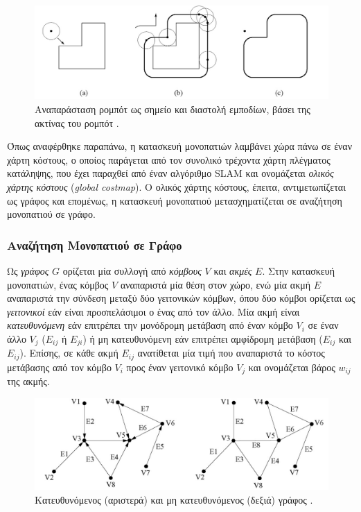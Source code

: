 \begin{figure}[!ht]
	\centering
	\includegraphics[width = 0.7\linewidth]{Chapters/Chapter3/Figures/point_robot_and_inflated_obstacles.png}
	\caption[Αναπαράσταση ρομπότ ως σημείο και διαστολή εμποδίων, βάσει της ακτίνας του ρομπότ. ]{Αναπαράσταση ρομπότ ως σημείο και διαστολή εμποδίων, βάσει της ακτίνας του ρομπότ \cite{principles_of_robot_motion}.}
	\label{fig:point_robot_and_inflated_obstacles}
\end{figure}

\bigskip
Όπως αναφέρθηκε παραπάνω, η κατασκευή μονοπατιών λαμβάνει χώρα πάνω σε έναν χάρτη κόστους, ο οποίος παράγεται από τον συνολικό τρέχοντα χάρτη πλέγματος κατάληψης, που έχει παραχθεί από έναν αλγόριθμο SLAM και ονομάζεται \textit{ολικός χάρτης κόστους} (\textit{global costmap}). Ο ολικός χάρτης κόστους, έπειτα, αντιμετωπίζεται ως γράφος και επομένως, η κατασκευή μονοπατιού μετασχηματίζεται σε αναζήτηση μονοπατιού σε γράφο.

\bigskip 
\subsubsection{Αναζήτηση Μονοπατιού σε Γράφο} \label{sssec:graph_search}
Ως \textit{γράφος} $G$ ορίζεται μία συλλογή από \textit{κόμβους} $V$ και \textit{ακμές} $E$. Στην κατασκευή μονοπατιών, ένας κόμβος $V$ αναπαριστά μία θέση στον χώρο, ενώ μία ακμή $E$ αναπαριστά την σύνδεση μεταξύ δύο γειτονικών κόμβων, όπου δύο κόμβοι ορίζεται ως \textit{γειτονικοί} εάν είναι προσπελάσιμοι ο ένας από τον άλλο. Μία ακμή είναι \textit{κατευθυνόμενη} εάν επιτρέπει την μονόδρομη μετάβαση από έναν κόμβο $V_i$ σε έναν άλλο $V_j$ ($E_{ij}$ ή $E_{ji}$) ή μη κατευθυνόμενη εάν επιτρέπει αμφίδρομη μετάβαση ($E_{ij}$ και $E_{ij}$). Επίσης, σε κάθε ακμή $E_{ij}$ ανατίθεται μία τιμή που αναπαριστά το κόστος μετάβασης από τον κόμβο $V_i$ προς έναν γειτονικό κόμβο $V_j$ και ονομάζεται βάρος $w_{ij}$ της ακμής.

\begin{figure}[!ht]
	\centering
	\includegraphics[width=0.6\linewidth]{Chapters/Chapter3/Figures/directed_and_non_graph.png}
	\caption[Κατευθυνόμενος (αριστερά) και μη κατευθυνόμενος (δεξιά) γράφος.]{Κατευθυνόμενος (αριστερά) και μη κατευθυνόμενος (δεξιά) γράφος \cite{principles_of_robot_motion}.}
	\label{fig:directed_and_non_graph}
\end{figure}

